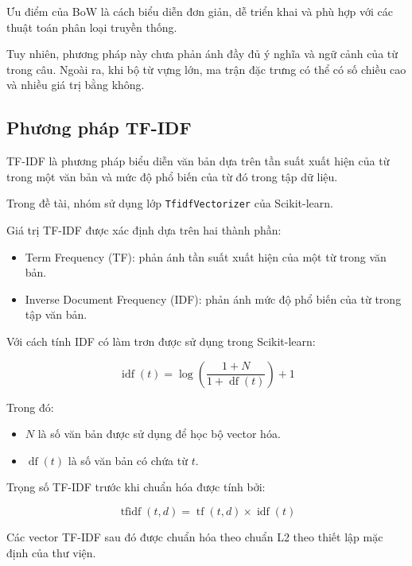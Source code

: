 Ưu điểm của BoW là cách biểu diễn đơn giản, dễ triển khai và phù hợp với các thuật toán phân loại truyền thống.

Tuy nhiên, phương pháp này chưa phản ánh đầy đủ ý nghĩa và ngữ cảnh của từ trong câu. Ngoài ra, khi bộ từ vựng lớn, ma trận đặc trưng có thể có số chiều cao và nhiều giá trị bằng không.


\subsection{Phương pháp TF-IDF}

TF-IDF là phương pháp biểu diễn văn bản dựa trên tần suất xuất hiện của từ trong một văn bản và mức độ phổ biến của từ đó trong tập dữ liệu.

Trong đề tài, nhóm sử dụng lớp \texttt{TfidfVectorizer} của Scikit-learn.

Giá trị TF-IDF được xác định dựa trên hai thành phần:

\begin{itemize}
    \item Term Frequency (TF): phản ánh tần suất xuất hiện của một từ trong văn bản.

    \item Inverse Document Frequency (IDF): phản ánh mức độ phổ biến của từ trong tập văn bản.
\end{itemize}

Với cách tính IDF có làm trơn được sử dụng trong Scikit-learn:

\begin{equation}
\operatorname{idf}(t)
=
\log\left(
\frac{1+N}{1+\operatorname{df}(t)}
\right)+1
\end{equation}

Trong đó:

\begin{itemize}
    \item $N$ là số văn bản được sử dụng để học bộ vector hóa.

    \item $\operatorname{df}(t)$ là số văn bản có chứa từ $t$.
\end{itemize}

Trọng số TF-IDF trước khi chuẩn hóa được tính bởi:

\begin{equation}
\operatorname{tfidf}(t,d)
=
\operatorname{tf}(t,d)
\times
\operatorname{idf}(t)
\end{equation}

Các vector TF-IDF sau đó được chuẩn hóa theo chuẩn L2 theo thiết lập mặc định của thư viện.

